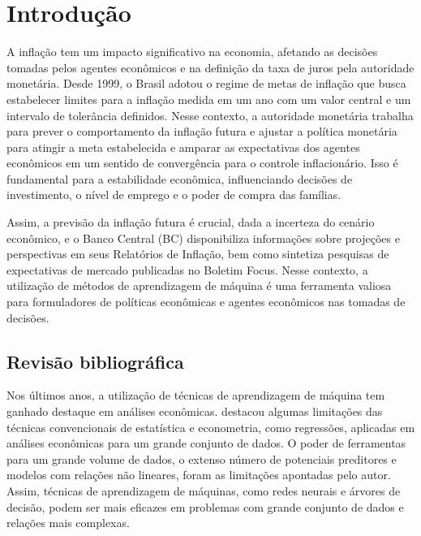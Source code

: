 
\chapter[Introdução]{Introdução}

A inflação tem um impacto significativo na economia, afetando as decisões tomadas pelos agentes econômicos e na definição da taxa de juros pela autoridade monetária. Desde 1999, o Brasil adotou o regime de metas de inflação que busca estabelecer limites para a inflação medida em um ano com um valor central e um intervalo de tolerância definidos. Nesse contexto, a autoridade monetária trabalha para prever o comportamento da inflação futura e ajustar a política monetária para atingir a meta estabelecida e amparar as expectativas dos agentes econômicos em um sentido de convergência para o controle inflacionário. Isso é fundamental para a estabilidade econômica, influenciando decisões de investimento, o nível de emprego e o poder de compra das famílias.

Assim, a previsão da inflação futura é crucial, dada a incerteza do cenário econômico, e o Banco Central (BC) disponibiliza informações sobre projeções e  perspectivas em seus Relatórios de Inflação, bem como sintetiza pesquisas de expectativas de mercado publicadas no Boletim Focus. Nesse contexto, a utilização de métodos de aprendizagem de máquina é uma ferramenta valiosa para formuladores de políticas econômicas e agentes econômicos nas tomadas de decisões.

\section{Revisão bibliográfica}\label{sec-revisao-bibliografica}

Nos últimos anos, a utilização de técnicas de aprendizagem de máquina tem ganhado destaque em análises econômicas.  destacou algumas limitações das técnicas convencionais de estatística e econometria, como regressões, aplicadas em análises econômicas para um grande conjunto de dados. O poder de ferramentas para um grande volume de dados, o extenso número de potenciais preditores e modelos com relações não lineares, foram as limitações apontadas pelo autor. Assim, técnicas de aprendizagem de máquinas, como redes neurais e árvores de decisão, podem ser mais eficazes em problemas com grande conjunto de dados e relações mais complexas.


